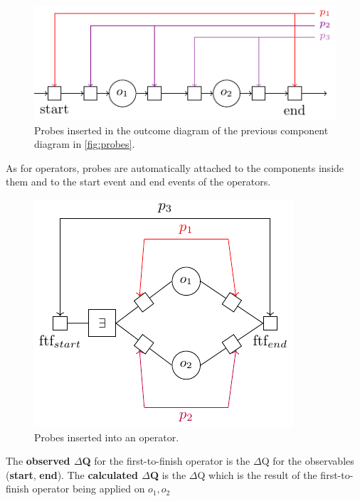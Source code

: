         \begin{figure}[H]
            \begin{center}
                \includegraphics[scale=1.3]{tikz/probe_1.pdf}
            \end{center}
            \label{fig:probes_o}
            \caption{Probes inserted in the outcome diagram of the previous component diagram in \cref{fig:probes}.}
        \end{figure}
       
       As for operators, probes are automatically attached to the components inside them and to the start event and end events of the operators. 

       \begin{figure}[H]
           \begin{center}
                \includegraphics[scale = 1.3]{tikz/probe_2.pdf}
            \end{center}
            \label{fig:probes_op}
            \caption{Probes inserted into an operator.}
       \end{figure}
    
    The \textbf{observed $\Delta$Q} for the first-to-finish operator is the $\Delta$Q for the observables (\textbf{start}, \textbf{end}). The \textbf{calculated $\Delta$Q} is the $\Delta$Q which is the result of the first-to-finish operator being applied on $o_1, o_2$
        


